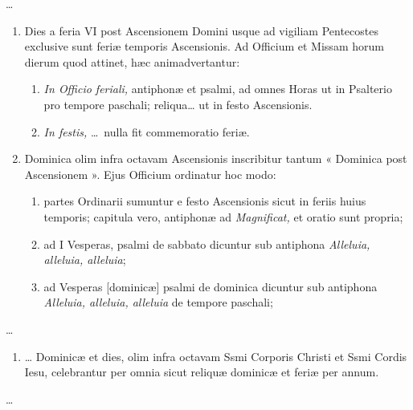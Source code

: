 \documentclass[vesperale_romanum.tex]{subfiles}
\begin{document}
…

\begin{enumerate}[nosep,start=29]
\item Dies a feria VI post Ascensionem Domini usque ad vigiliam Pentecostes exclusive sunt feriæ temporis Ascensionis. Ad Officium et Missam horum dierum quod attinet, hæc animadvertantur:
\begin{enumerate}[nosep,label=\alph*.]
\item \textit{In Officio feriali,} antiphonæ et psalmi, ad omnes Horas ut in Psalterio pro tempore paschali; reliqua… ut in festo Ascensionis.
 \item \textit{In festis,} … nulla fit commemoratio feriæ.
 \end{enumerate}
 
 \item Dominica olim infra octavam Ascensionis inscribitur tantum « Dominica post Ascensionem ». Ejus Officium ordinatur hoc modo:
 \begin{enumerate}[nosep,label=\alph*.]
\item partes Ordinarii sumuntur e festo Ascensionis sicut in feriis huius temporis; capitula vero, antiphonæ ad \textit{Magnificat,} et oratio sunt propria;
\item ad I Vesperas, psalmi de sabbato dicuntur sub antiphona \textit{Alleluia, alleluia, alleluia};
\item ad Vesperas [dominicæ] psalmi de dominica dicuntur sub antiphona \textit{Alleluia, alleluia, alleluia} de tempore paschali;
\end{enumerate}\end{enumerate}

…

\begin{enumerate}[nosep,start=33]
\item … Dominicæ et dies, olim infra octavam Ssmi Corporis Christi et Ssmi Cordis Iesu, celebrantur per omnia sicut reliquæ dominicæ et feriæ per annum.
\end{enumerate}

…
\end{document}
